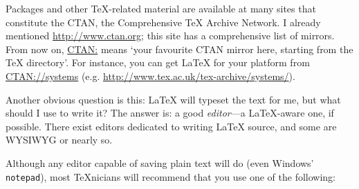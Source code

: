 \documentclass[11pt]{article}
\begin{document}
Packages and other \TeX{}-related material are available at many sites
that constitute the CTAN, the Comprehensive TeX Archive Network. I already
mentioned \url{http://www.ctan.org}; this site has a comprehensive list of
mirrors. From now on, \href{http://www.ctan.org}{CTAN:} means `your
favourite CTAN mirror here, starting from the \TeX{} directory'. For
instance, you can get \LaTeX{} for your platform from
\href{http://www.tex.ac.uk/tex-archive/systems}{CTAN://systems} (e.g.
\url{http://www.tex.ac.uk/tex-archive/systems/}).

Another obvious question is this: \LaTeX{} will typeset the text for me,
but what should I use to write it? The answer is: a good \emph{editor}---a
\LaTeX{}-aware one, if possible. There exist editors dedicated to writing
\LaTeX{} source, and some are WYSIWYG or nearly so.

Although any editor capable of saving plain text will do (even Windows'
\texttt{notepad}), most \TeX{}nicians will recommend that you use one of
the following:
\end{document}
